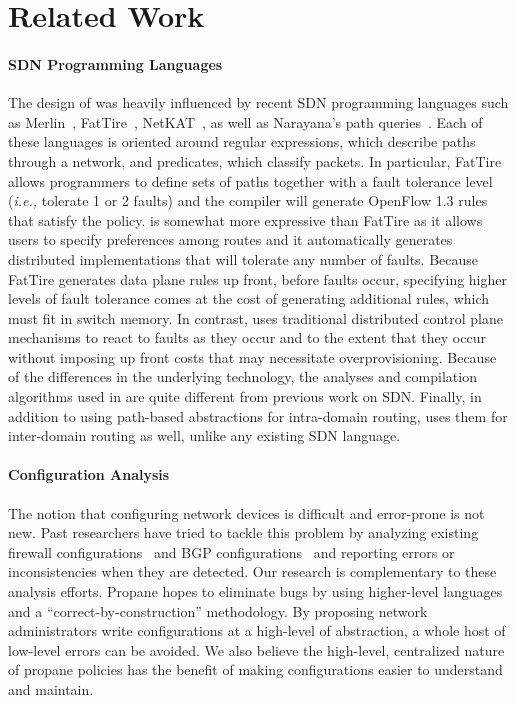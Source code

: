 \section{Related Work}


\paragraph*{SDN Programming Languages}
The design of \sysname{} was heavily influenced by recent SDN programming
languages such as Merlin~\cite{foster:merlin}, FatTire~\cite{fattire},
NetKAT~\cite{netkat}, as well as Narayana's path queries~\cite{queries}.
Each of these languages is oriented around regular expressions, which
describe paths through a network, and predicates, which classify packets.
In particular, FatTire allows programmers to define sets of paths together
with a fault tolerance level (\emph{i.e.,} tolerate 1 or 2 faults)
and the compiler will generate
OpenFlow 1.3 rules that satisfy the policy.  \sysname is somewhat more
expressive than FatTire as it allows users to specify preferences among
routes and it automatically generates distributed
implementations that will tolerate
any number of faults.  Because FatTire generates data plane rules up front,
before faults occur, specifying higher levels of fault tolerance comes 
at the cost of generating additional rules, which must fit in switch
memory.  In contrast, \sysname uses traditional distributed
control plane mechanisms to react to faults as they occur and to the
extent that they occur without imposing up front costs that may
necessitate overprovisioning.
Because of the differences in the underlying technology, the analyses
and compilation algorithms used in \sysname are quite different from
previous work on SDN.  Finally, in addition to using path-based abstractions
for intra-domain routing, \sysname uses them for inter-domain routing as
well, unlike any existing SDN language.

\paragraph*{Configuration Analysis}  The notion that
configuring network devices is difficult and error-prone is not new.  Past 
researchers have
tried to tackle this problem by analyzing existing 
firewall configurations~\cite{fang,lumeta,margrave} and
BGP configurations~\cite{feamster+:rcc,feamster:thesis,ipassure,batfish,bagpipe} and reporting errors or
inconsistencies when they are detected. 
Our research is complementary to these analysis
efforts.  Propane hopes to eliminate bugs by using higher-level
languages and a ``correct-by-construction''
methodology.  By proposing network administrators write configurations
at a high-level of abstraction, a whole host of low-level errors can be 
avoided.  We also believe the high-level, centralized nature of propane policies
has the benefit of making configurations
easier to understand and maintain.

